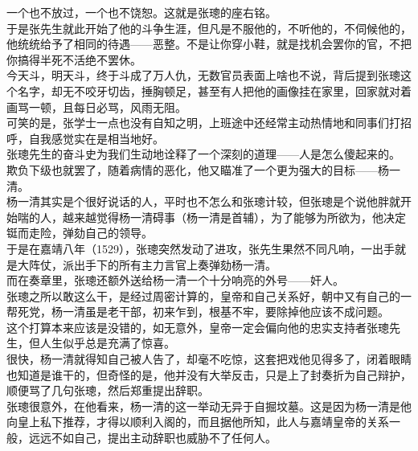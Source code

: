 \begin{multicols}{\theparacolNo}
一个也不放过，一个也不饶恕。这就是张璁的座右铭。\\

于是张先生就此开始了他的斗争生涯，但凡是不服他的，不听他的，不伺候他的，他统统给予了相同的待遇——恶整。不是让你穿小鞋，就是找机会罢你的官，不把你搞得半死不活绝不罢休。\\

今天斗，明天斗，终于斗成了万人仇，无数官员表面上啥也不说，背后提到张璁这个名字，却无不咬牙切齿，捶胸顿足，甚至有人把他的画像挂在家里，回家就对着画骂一顿，且每日必骂，风雨无阻。\\

可笑的是，张学士一点也没有自知之明，上班途中还经常主动热情地和同事们打招呼，自我感觉实在是相当地好。\\

张璁先生的奋斗史为我们生动地诠释了一个深刻的道理——人是怎么傻起来的。\\

欺负下级也就罢了，随着病情的恶化，他又瞄准了一个更为强大的目标——杨一清。\\

杨一清其实是个很好说话的人，平时也不怎么和张璁计较，但张璁是个说他胖就开始喘的人，越来越觉得杨一清碍事（杨一清是首辅），为了能够为所欲为，他决定铤而走险，弹劾自己的领导。\\

于是在嘉靖八年（1529），张璁突然发动了进攻，张先生果然不同凡响，一出手就是大阵仗，派出手下的所有主力言官上奏弹劾杨一清。\\

而在奏章里，张璁还额外送给杨一清一个十分响亮的外号——奸人。\\

张璁之所以敢这么干，是经过周密计算的，皇帝和自己关系好，朝中又有自己的一帮死党，杨一清虽是老干部，初来乍到，根基不牢，要除掉他应该不成问题。\\

这个打算本来应该是没错的，如无意外，皇帝一定会偏向他的忠实支持者张璁先生，但人生似乎总是充满了惊喜。\\

很快，杨一清就得知自己被人告了，却毫不吃惊，这套把戏他见得多了，闭着眼睛也知道是谁干的，但奇怪的是，他并没有大举反击，只是上了封奏折为自己辩护，顺便骂了几句张璁，然后郑重提出辞职。\\

张璁很意外，在他看来，杨一清的这一举动无异于自掘坟墓。这是因为杨一清是他向皇上私下推荐，才得以顺利入阁的，而且据他所知，此人与嘉靖皇帝的关系一般，远远不如自己，提出主动辞职也威胁不了任何人。\\


\end{multicols}
